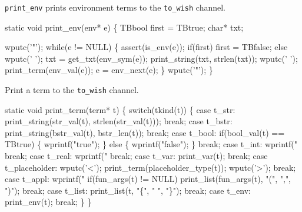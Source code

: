 
{\tt print\_env} prints environment terms to the {\tt to\_wish} channel.

\nwenddocs{}\endmoddef\let\nwnotused=\nwoutput{}
static void print_env(env* e)
\{
   TBbool first = TBtrue;
   char* txt;
   
   wputc('"');
   while(e != NULL)
   \{
      assert(is_env(e));
      if(first)
        first = TBfalse;
      else
        wputc(' ');
      txt = get_txt(env_sym(e));
      print_string(txt, strlen(txt));
      wputc(' ');
      print_term(env_val(e));
      e = env_next(e);
   \}
   wputc('"');
\}
\nwendcode{}\nwdocspar



Print a term to the {\tt to\_wish} channel.

\nwenddocs{}\endmoddef\let\nwnotused=\nwoutput{}
static void print_term(term* t)
\{
   switch(tkind(t))
   \{
      case t_str:
         print_string(str_val(t), strlen(str_val(t)));
         break;
      case t_bstr:
         print_string(bstr_val(t), bstr_len(t));
         break;
      case t_bool:
         if(bool_val(t) == TBtrue) \{
            wprintf("true");
         \} else \{
            wprintf("false");
         \}
         break;
      case t_int:
         wprintf("%
         break;
      case t_real:
         wprintf("%
         break;
      case t_var:
         print_var(t);
         break;
      case t_placeholder:
         wputc('<');
         print_term(placeholder_type(t));
         wputc('>');
         break;
      case t_appl:
         wprintf("%
         if(fun_args(t) != NULL)
            print_list(fun_args(t), "(", ",", ")");
         break;
      case t_list:
         print_list(t, "\{", " ", "\}");
         break;
      case t_env:
         print_env(t);
         break;
   \}
\}
\nwendcode{}\nwdocspar



